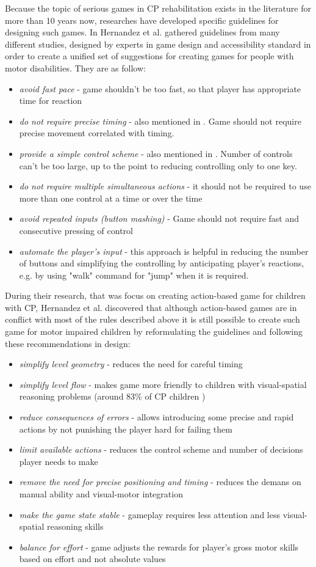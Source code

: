 Because the topic of serious games in CP rehabilitation exists in the literature for more than 10 years now, researches have developed specific guidelines for designing such games. In \cite{action} Hernandez et al. gathered guidelines from many different studies, designed by experts in game design and accessibility standard in order to create a unified set of suggestions for creating games for people with motor disabilities. They are as follow:
\begin{itemize}
\item \emph{avoid fast pace} - game shouldn't be too fast, so that player has appropriate time for reaction
\item \emph{do not require precise timing} - also mentioned in \cite{BBC,gag}. Game should not require precise movement correlated with timing.
\item \emph{provide a simple control scheme} - also mentioned in \cite{BBC,gag}. Number of controls can't be too large, up to the point to reducing controlling only to one key. 
\item \emph{do not require multiple simultaneous actions} - it should not be required to use more than one control at a time or over the time
\item \emph{avoid repeated inputs (button mashing)} - Game should not require fast and consecutive pressing of control
\item \emph{automate the player's input} - this approach is helpful in reducing the number of buttons and simplifying the controlling by anticipating player's reactions, e.g. by using "walk" command for "jump" when it is required.
\end{itemize}

During their research, that was focus on creating action-based game for children with CP, Hernandez et al. discovered that although action-based games are in conflict with most of the rules described above it is still possible to create such game for motor impaired children by reformulating the guidelines and following these recommendations in design:
\begin{itemize}
\item \emph{simplify level geometry} - reduces the need for careful timing
\item \emph{simplify level flow} - makes game more friendly to children with visual-spatial reasoning problems (around 83\% of CP children \cite{statistic}) 
\item \emph{reduce consequences of errors} - allows introducing some precise and rapid actions by not punishing the player hard for failing them
\item \emph{limit available actions} - reduces the control scheme and number of decisions player needs to make
\item \emph{remove the need for precise positioning and timing} - reduces the demans on manual ability and visual-motor integration
\item \emph{make the game state stable} - gameplay requires less attention and less visual-spatial reasoning skills
\item \emph{balance for effort} - game adjusts the rewards for player's gross motor skills based on effort and not absolute values
\end{itemize}
